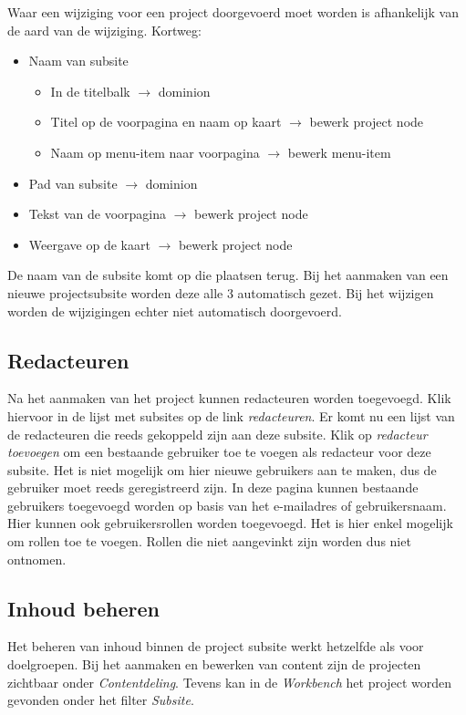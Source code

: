 Waar een wijziging voor een project doorgevoerd moet worden is afhankelijk van de aard van de wijziging. Kortweg:
\begin{itemize}
\item Naam van subsite
\begin{itemize}
\item In de titelbalk $\rightarrow$ dominion
\item Titel op de voorpagina en naam op kaart $\rightarrow$ bewerk project node
\item Naam op menu-item naar voorpagina $\rightarrow$ bewerk menu-item
\end{itemize}
\item Pad van subsite $\rightarrow$ dominion
\item Tekst van de voorpagina $\rightarrow$ bewerk project node
\item Weergave op de kaart $\rightarrow$ bewerk project node
\end{itemize}
De naam van de subsite komt op die plaatsen terug. Bij het aanmaken van een nieuwe projectsubsite worden deze alle 3 automatisch gezet. Bij het wijzigen worden de wijzigingen echter niet automatisch doorgevoerd.

\subsection{Redacteuren}

Na het aanmaken van het project kunnen redacteuren worden toegevoegd. Klik hiervoor in de lijst met subsites op de link \emph{redacteuren}. Er komt nu een lijst van de redacteuren die reeds gekoppeld zijn aan deze subsite. Klik op \emph{redacteur toevoegen} om een bestaande gebruiker toe te voegen als redacteur voor deze subsite. Het is niet mogelijk om hier nieuwe gebruikers aan te maken, dus de gebruiker moet reeds geregistreerd zijn. In deze pagina kunnen bestaande gebruikers toegevoegd worden op basis van het e-mailadres of gebruikersnaam. Hier kunnen ook gebruikersrollen worden toegevoegd. Het is hier enkel mogelijk om rollen toe te voegen. Rollen die niet aangevinkt zijn worden dus niet ontnomen.

\subsection{Inhoud beheren}

Het beheren van inhoud binnen de project subsite werkt hetzelfde als voor doelgroepen. Bij het aanmaken en bewerken van content zijn de projecten zichtbaar onder \emph{Contentdeling}. Tevens kan in de \emph{Workbench} het project worden gevonden onder het filter \emph{Subsite}.

